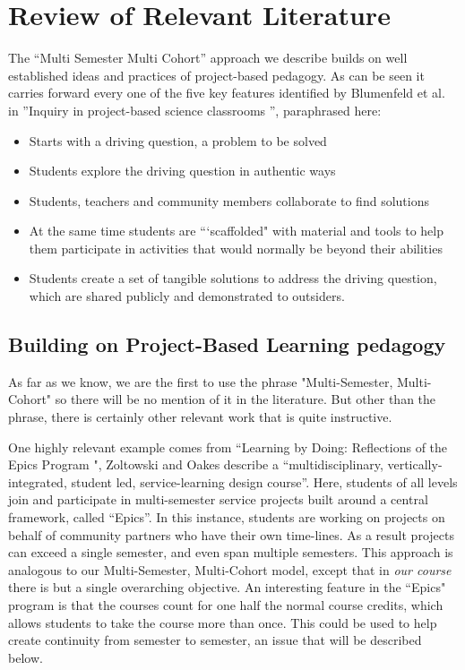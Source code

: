 \section{Review of Relevant Literature}

The ``Multi Semester Multi Cohort'' approach we describe builds on well established ideas and practices of project-based pedagogy\cite{projects}. As can be seen it carries forward every one of the five key features identified by Blumenfeld et al. in ''Inquiry in project-based science classrooms \cite{blumenfeld}'', paraphrased here:
\begin{itemize}
    \item Starts with a driving question, a problem to be solved
    \item Students explore the driving question in authentic ways
    \item Students, teachers and community members collaborate to find solutions
    \item At the same time students are ```scaffolded" with material and tools to help them participate in activities that would  normally be beyond their abilities
    \item Students create a set of tangible solutions to address the driving question, which are shared publicly and demonstrated to outsiders.
\end{itemize}

\subsection{Building on Project-Based Learning pedagogy}
As far as we know, we are the first to use the phrase "Multi-Semester, Multi-Cohort" so there will be no mention of it in the literature. But other than the phrase, there is certainly other relevant work that is quite instructive. 

One highly relevant example comes from ``Learning by Doing: Reflections of the Epics Program \cite{Epics}", Zoltowski and Oakes describe a ``multidisciplinary, vertically-integrated, student led, service-learning design course''. Here, students of all levels join and participate in multi-semester service projects built around a central framework, called ``Epics''. In this instance, students are working on projects on behalf of community partners who have their own time-lines. As a result projects can exceed a single semester, and even span multiple semesters. This approach is analogous to our Multi-Semester, Multi-Cohort model, except that in \textit{our course} there is but a single overarching objective. An interesting feature in the ``Epics" program is that the courses count for one half the normal course credits, which allows students to take the course more than once. This could be used to help create continuity from semester to semester, an issue that will be described below. 

